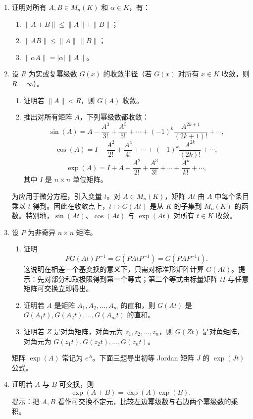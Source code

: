 \begin{enumerate}[label=\arabic*.]
\item 证明对所有 $A,B\in M_n(K)$ 和 $\alpha\in K$，有：
\begin{enumerate}[label=(\alph*)]
\item $\|A+B\|\leq \|A\|+\|B\|$；
\item $\|AB\|\leq \|A\|\,\|B\|$；
\item $\|\alpha A\|=|\alpha|\,\|A\|$。
\end{enumerate}

\item 设 $R$ 为实或复幂级数 $G(x)$ 的收敛半径（若 $G(x)$ 对所有 $x\in K$ 收敛，则 $R=\infty$）。
\begin{enumerate}[label=(\alph*)]
\item 证明若 $\|A\|<R$，则 $G(A)$ 收敛。
\item 推出对所有矩阵 $A$，下列幂级数都收敛：
\[
\sin(A)=A-\frac{A^3}{3!}+\frac{A^5}{5!}+\cdots+(-1)^k\frac{A^{2k+1}}{(2k+1)!}+\cdots,
\]
\[
\cos(A)=I-\frac{A^2}{2!}+\frac{A^4}{4!}+\cdots+(-1)^k\frac{A^{2k}}{(2k)!}+\cdots,
\]
\[
\exp(A)=I+A+\frac{A^2}{2!}+\frac{A^3}{3!}+\cdots+\frac{A^k}{k!}+\cdots,
\]
其中 $I$ 是 $n\times n$ 单位矩阵。
\end{enumerate}

为应用于微分方程，引入变量 $t$。对 $A\in M_n(K)$，矩阵 $At$ 由 $A$ 中每个条目乘以 $t$ 得到。因此在收敛点上，$t\mapsto G(At)$ 是从 $K$ 的子集到 $M_n(K)$ 的函数。特别地，$\sin(At)$、$\cos(At)$ 与 $\exp(At)$ 对所有 $t\in K$ 收敛。

\item 设 $P$ 为非奇异 $n\times n$ 矩阵。
\begin{enumerate}[label=(\alph*)]
\item 证明
\[
PG(At)P^{-1}=G(PAtP^{-1})=G(PAP^{-1}t).
\]
这说明在相差一个基变换的意义下，只需对标准形矩阵计算 $G(At)$。提示：先对部分和取极限得到第一个等式；第二个等式由标量矩阵 $tI$ 与任意矩阵可交换立即得出。
\item 证明若 $A$ 是矩阵 $A_1,A_2,\ldots,A_m$ 的直和，则 $G(At)$ 是 $G(A_1t),G(A_2t),\ldots,G(A_mt)$ 的直和。
\item 证明若 $Z$ 是对角矩阵，对角元为 $z_1,z_2,
\ldots,z_n$，则 $G(Zt)$ 是对角矩阵，对角元为 $G(z_1t),G(z_2t),
\ldots,G(z_nt)$。
\end{enumerate}

矩阵 $\exp(A)$ 常记为 $e^A$。下面三题导出初等 Jordan 矩阵 $J$ 的 $\exp(Jt)$ 公式。

\item 证明若 $A$ 与 $B$ 可交换，则
\[
\exp(A+B)=\exp(A)\exp(B).
\]
提示：把 $A,B$ 看作可交换不定元，比较左边幂级数与右边两个幂级数的乘积。


\end{enumerate}
